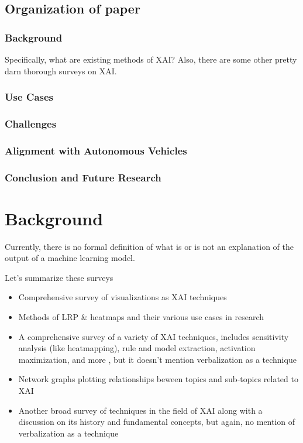 \documentclass{IEEEtran}
\begin{document}
\subsection{Organization of paper}

\subsubsection{Background}

Specifically, what are existing methods of XAI?  Also, there are some other pretty darn thorough surveys on XAI.

\subsubsection{Use Cases}

\subsubsection{Challenges}

\subsubsection{Alignment with Autonomous Vehicles}

\subsubsection{Conclusion and Future Research}

\section{Background}

Currently, there is no formal definition of what is or is not an explanation of the output of a machine learning model.

Let's summarize these surveys

\begin{itemize}
    \item Comprehensive survey of visualizations as XAI techniques \cite{Hohman2018}
    \item Methods of LRP \& heatmaps and their various use cases in research\cite{MONTAVON20181}
    \item A comprehensive survey of a variety of XAI techniques, includes sensitivity analysis (like heatmapping), rule and model extraction, activation maximization, and more \cite{Guidotti:2018:SME:3271482.3236009}, but it doesn't mention verbalization as a technique
    \item Network graphs plotting relationships beween topics and sub-topics related to XAI \cite{Abdul:2018:TTE:3173574.3174156}
    \item Another broad survey of techniques in the field of XAI along with a discussion on its history and fundamental concepts, but again, no mention of verbalization as a technique\cite{Adadi2018}
\end{itemize}
\end{document}
